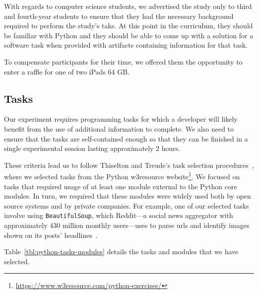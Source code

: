 {With regards to computer science students, we advertised the study only to third and fourth-year students to ensure that they had the necessary background required to perform the study's taks.
At this point in the curriculum, they should be familiar with Python and they should be able to come up with a solution 
for a software task when provided with artifacts containing information for that task.


To compensate participants for their time, we offered them the opportunity to enter a raffle for one of two iPads 64 GB.




\subsection{Tasks}
\label{sec:experiment-tasks}

Our experiment requires programming tasks for which a developer will likely benefit from the use of additional information to complete. We also need to ensure that the tasks are self-contained enough so that they can be finished in a single experimental session lasting approximately 2 hours.


These criteria lead us to 
follow Thiselton and Treude's task selection procedures~\cite{thiselton2019}, 
where we selected tasks from the Python w3resource website\footnote{\url{https://www.w3resource.com/python-exercises/}}.
We focused on tasks that required usage of at least one module external to the Python core modules.
In turn, we required that these modules were widely used both by open source systems and by private companies.
For example, one of our selected tasks involve using \texttt{BeautifulSoup},
which Reddit---a social news aggregator with approximately 430 million monthly users---uses 
to parse urls and identify images shown on its posts' headlines~\cite{bs4-reddit}. 





Table~\ref{tbl:python-tasks-modules} details the tasks and modules that we have selected. 













\clearpage




}
